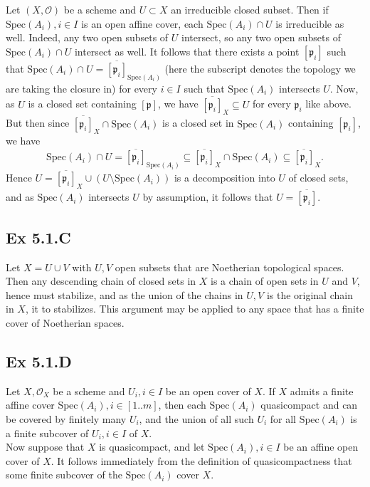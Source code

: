 \documentclass{article}
\theoremstyle{definition}
\newcommand{\Spec}{\text{Spec}}
\begin{document}
Let $(X, \mathcal{O})$ be a scheme and $U \subset X$ an irreducible closed
subset. Then if $\Spec(A_i), i \in I$ is an open affine cover, each $\Spec(A_i)
\cap U$ is irreducible as well. Indeed, any two open subsets of $U$ intersect,
so any two open subsets of $\Spec(A_i) \cap U$ intersect as well. It follows
that there exists a point $[\mathfrak{p}_i]$ such that $\Spec(A_i) \cap U =
\overline{[\mathfrak{p}_i]}_{\Spec(A_i)}$ (here the subscript denotes the
topology we are taking the closure in) for every $i \in I$ such that
$\Spec(A_i)$ intersects $U$. Now, as $U$ is a closed set containing
$[\mathfrak{p}]$, we have $\overline{[\mathfrak{p}_i]}_X \subseteq U$ for every
$\mathfrak{p}_i$ like above. But then since $\overline{[\mathfrak{p}_i]}_X \cap
\Spec(A_i)$ is a closed set in $\Spec(A_i)$ containing $[\mathfrak{p}_i]$, we
have
\[
	\Spec(A_i) \cap U
	=
	\overline{[\mathfrak{p}_i]}_{\Spec(A_i)}
	\subseteq
	\overline{[\mathfrak{p}_i]}_X \cap \Spec(A_i)
	\subseteq
	\overline{[\mathfrak{p}_i]}_X.
\]
Hence $U = \overline{[\mathfrak{p}_i]}_X \cup (U \setminus \Spec(A_i))$ is a
decomposition into $U$ of closed sets, and as $\Spec(A_i)$ intersects $U$ by
assumption, it follows that $U = \overline{[\mathfrak{p}_i]}$.

\subsection*{Ex 5.1.C}

Let $X = U \cup V$ with $U, V$ open subsets that are Noetherian topological
spaces. Then any descending chain of closed sets in $X$ is a chain of open sets
in $U$ and $V$, hence must stabilize, and as the union of the chains in $U, V$
is the original chain in $X$, it to stabilizes. This argument may be applied to
any space that has a finite cover of Noetherian spaces.

\subsection*{Ex 5.1.D}

Let $X, \mathcal{O}_X$ be a scheme and $U_i, i \in I$ be an open cover of $X$.
If $X$ admits a finite affine cover $\Spec(A_i), i \in [1..m]$, then each
$\Spec(A_i)$ quasicompact and can be covered by finitely many $U_i$, and the
union of all such $U_i$ for all $\Spec(A_i)$ is a finite subcover of $U_i,i \in
I$ of $X$. \\

Now suppose that $X$ is quasicompact, and let $\Spec(A_i), i \in I$ be an
affine open cover of $X$. It follows immediately from the definition of
quasicompactness that some finite subcover of the $\Spec(A_i)$ cover $X$.
\end{document}
